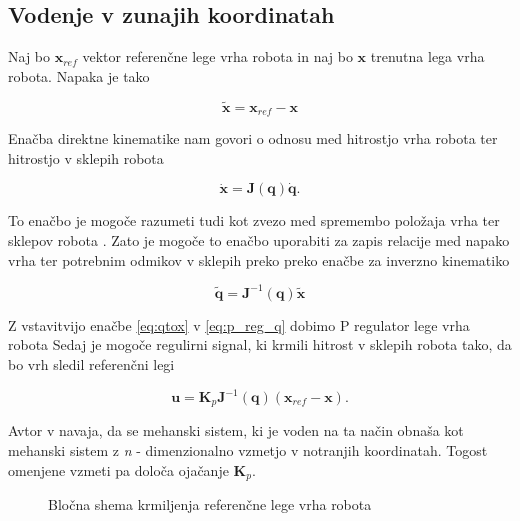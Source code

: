 \documentclass[a4paper]{article}
\begin{document}
\subsection{Vodenje v zunajih koordinatah} \label{sec:admit_out}

Naj bo $\textbf{x}_{ref}$ vektor referenčne lege vrha robota in naj bo $\textbf{x}$ trenutna lega vrha robota. Napaka je tako

\begin{equation} \label{eq:xerr}
\tilde{\textbf{x}} = \textbf{x}_{ref}  - \textbf{x}
\end{equation}

Enačba direktne kinematike nam govori o odnosu med hitrostjo vrha robota ter hitrostjo v sklepih robota

\begin{equation} \label{eq:qtox}
\dot{\textbf{x}} = \textbf{J}(\textbf{q})  \dot{\textbf{q}}.
\end{equation}

To enačbo je mogoče razumeti tudi kot zvezo med spremembo položaja vrha ter sklepov robota \cite{mihelj_vodenje}. Zato je mogoče to enačbo uporabiti za zapis relacije med napako vrha ter potrebnim odmikov v sklepih preko preko enačbe za inverzno kinematiko

\begin{equation} \label{eq:qerr}
\tilde{\textbf{q}} = \textbf{J}^{-1}(\textbf{q})  \tilde{\textbf{x}}
\end{equation}

Z vstavitvijo enačbe \ref{eq:qtox} v \ref{eq:p_reg_q} dobimo P regulator lege vrha robota Sedaj je mogoče regulirni signal, ki krmili hitrost v sklepih robota tako, da bo vrh sledil referenčni legi

\begin{equation} \label{eq:outcontrol}
\textbf{u} = \textbf{K}_p  \textbf{J}^{-1}(\textbf{q})  (\textbf{x}_{ref} - \textbf{x}).
\end{equation}

Avtor v \cite{mihelj_vodenje} navaja, da se mehanski sistem, ki je voden na ta način obnaša kot mehanski sistem z \textit{n} - dimenzionalno vzmetjo v notranjih koordinatah. Togost omenjene vzmeti pa določa ojačanje $\textbf{K}_p$.

\begin{figure}
	
	\caption{Bločna shema krmiljenja referenčne lege vrha robota}
	\label{fig:xfeedback}
\end{figure}
\end{document}
